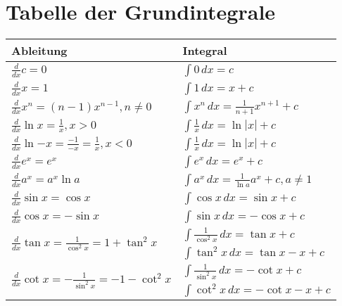 
\section{Tabelle der Grundintegrale}

\begin{table}[!htb]
    \begin{minipage}{.5\linewidth}
        \centering
        \begin{tabular}{ll}
            \toprule
            Ableitung & Integral \\

            \midrule
            $\frac{d}{dx} c = 0$ &
            $\int 0\,dx = c$
            \\
            $\frac{d}{dx} x = 1$ &
            $\int 1\,dx = x + c$
            \\
            $\frac{d}{dx} x^n = (n-1)x^{n-1}, n\not=0$ &
            $\int x^n\,dx = \frac{1}{n+1} x^{n+1} + c$
            \\
            $\frac{d}{dx} \ln{x} = \frac{1}{x}, x > 0$ &
            $\int \frac{1}{x}\,dx = \ln|x| + c$
            \\
            $\frac{d}{dx} \ln{-x} = \frac{-1}{-x} = \frac{1}{x}, x < 0$ &
            $\int \frac{1}{x}\,dx = \ln|x| + c$
            \\

            \midrule
            $\frac{d}{dx} e^x = e^x$ &
            $\int e^x\,dx = e^x + c$
            \\
            $\frac{d}{dx} a^x = a^x \ln{a}$ &
            $\int a^x\,dx = \frac{1}{\ln{a}} a^x + c, a \neq 1$
            \\

            \midrule
            $\frac{d}{dx} \sin{x} = \cos{x}$ &
            $\int \cos{x}\,dx = \sin{x} + c$
            \\
            $\frac{d}{dx} \cos{x} = -\sin{x}$ &
            $\int \sin{x}\,dx = -\cos{x} + c$
            \\
            \multirow{2}{*}{$\frac{d}{dx} \tan{x} = \frac{1}{\cos^2{x}} = 1 + \tan^2{x}$} &
            $\int \frac{1}{\cos^2{x}}\,dx = \tan{x} + c$ \\ &
            $\int \tan^2{x}\,dx = \tan{x}-x + c$
            \\
            \multirow{2}{*}{$\frac{d}{dx} \cot{x} = -\frac{1}{\sin^2{x}} = -1 - \cot^2{x}$} &
            $\int \frac{1}{\sin^2{x}}\,dx = -\cot{x} + c$ \\ &
            $\int \cot^2{x}\,dx = -\cot{x}-x + c$
            \\


\end{tabular}
\end{minipage}
\end{table}
